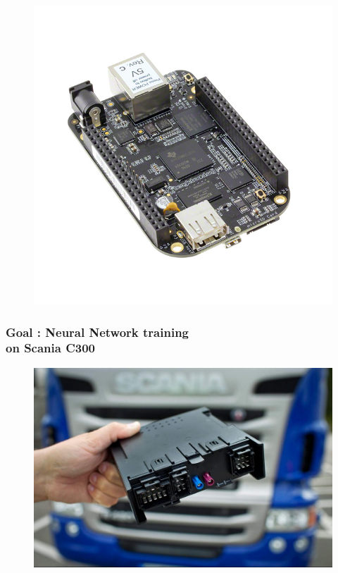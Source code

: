 \documentclass{beamer}
\begin{document}
\begin{frame}
\begin{figure}
    \includegraphics[scale=0.175]{../Body/images/bbb}
  \end{figure}

\end{frame}

\begin{frame}
  \frametitle{Goal : Neural Network training \\ on Scania C300}

  \begin{figure}
    \centering
    \includegraphics[scale=0.21]{../Body/images/c300.jpeg}
  \end{figure}

\end{frame}
\end{document}
